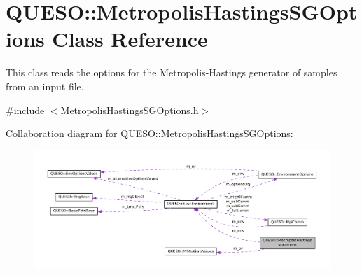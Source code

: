 \hypertarget{class_q_u_e_s_o_1_1_metropolis_hastings_s_g_options}{\section{Q\-U\-E\-S\-O\-:\-:Metropolis\-Hastings\-S\-G\-Options Class Reference}
\label{class_q_u_e_s_o_1_1_metropolis_hastings_s_g_options}
}


This class reads the options for the Metropolis-\/\-Hastings generator of samples from an input file.  




{\ttfamily \#include $<$Metropolis\-Hastings\-S\-G\-Options.\-h$>$}



Collaboration diagram for Q\-U\-E\-S\-O\-:\-:Metropolis\-Hastings\-S\-G\-Options\-:
\nopagebreak
\begin{figure}[H]
\begin{center}
\leavevmode
\includegraphics[width=350pt]{class_q_u_e_s_o_1_1_metropolis_hastings_s_g_options__coll__graph}
\end{center}
\end{figure}
